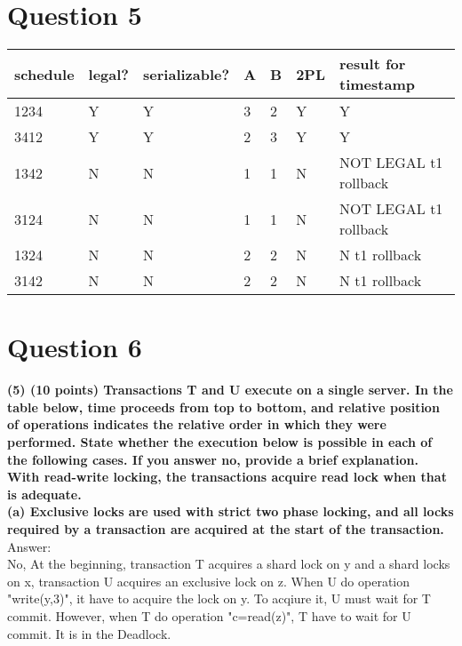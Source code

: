 \documentclass{article}
\begin{document}
\section{Question 5}
\begin{table}[h]
\begin{tabular}{|l|l|l|l|l|l|l|}
\hline
schedule & legal? & serializable? & A & B & 2PL & result for timestamp \\ \hline
1234     & Y      & Y             & 3 & 2 & Y   & Y                    \\ \hline
3412     & Y      & Y             & 2 & 3 & Y   & Y                    \\ \hline
1342     & N      & N             & 1 & 1 & N   & NOT LEGAL  t1 rollback           \\ \hline
3124     & N      & N             & 1 & 1 & N   & NOT LEGAL t1 rollback           \\ \hline
1324     & N      & N            & 2 & 2 & N    & N t1 rollback                   \\ \hline
3142     & N      & N             & 2 & 2 & N   & N t1 rollback                   \\ \hline
\end{tabular}
\end{table}

\section{Question 6}
\textbf{(5)	(10 points) Transactions T and U execute on a single server. In the table below, time proceeds from top to bottom, and relative position of operations indicates the relative order in which they were performed. 
State whether the execution below is possible in each of the following cases. If you answer no, provide a brief explanation. With read-write locking, the transactions acquire read lock when that is adequate.}\\

\textbf{(a)	Exclusive locks are used with strict two phase locking, and all locks required by a transaction are acquired at the start of the transaction.}\\

Answer:\\
No, At the beginning, transaction T acquires a shard lock on y and a shard locks on x, transaction U acquires an exclusive lock on z. When U do operation "write(y,3)", it have to acquire the lock on y. To acqiure it, U must wait for T commit. However, when T do operation "c=read(z)", T have to wait for U commit. It is in the Deadlock.\\
\end{document}
